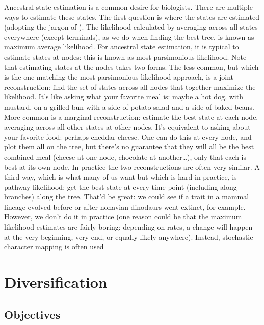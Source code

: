 \documentclass[
]{article}
\begin{document}
Ancestral state estimation is a common desire for biologists. There are multiple ways to estimate these states. The first question is where the states are estimated (adopting the jargon of \citet{steel_parsimony_2000}). The likelihood calculated by averaging across all states everywhere (except terminals), as we do when finding the best tree, is known as maximum average likelihood. For ancestral state estimation, it is typical to estimate states at nodes: this is known as most-parsimonious likelihood. Note that estimating states at the nodes takes two forms. The less common, but which is the one matching the most-parsimonious likelihood approach, is a joint reconstruction: find the set of states across all nodes that together maximize the likelihood. It's like asking what your favorite meal is: maybe a hot dog, with mustard, on a grilled bun with a side of potato salad and a side of baked beans. More common is a marginal reconstruction: estimate the best state at each node, averaging across all other states at other nodes. It's equivalent to asking about your favorite food: perhaps cheddar cheese. One can do this at every node, and plot them all on the tree, but there's no guarantee that they will all be the best combined meal (cheese at one node, chocolate at another\ldots), only that each is best at its own node. In practice the two reconstructions are often very similar. A third way, which is what many of us want but which is hard in practice, is pathway likelihood: get the best state at every time point (including along branches) along the tree. That'd be great: we could see if a trait in a mammal lineage evolved before or after nonavian dinodaurs went extinct, for example. However, we don't do it in practice (one reason could be that the maximum likelihood estimates are fairly boring: depending on rates, a change will happen at the very beginning, very end, or equally likely anywhere). Instead, stochastic character mapping is often used \citep{huelsenbeck_stochastic_2003}

\hypertarget{diversification}{%
\section{Diversification}\label{diversification}}

\hypertarget{objectives-4}{%
\subsection{Objectives}\label{objectives-4}}
\end{document}
